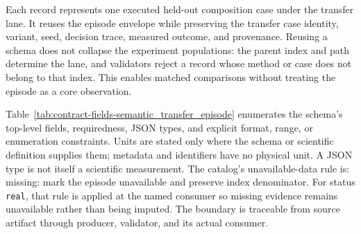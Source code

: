 Each record represents one executed held-out composition case under the transfer lane. It reuses the episode envelope while preserving the transfer case identity, variant, seed, decision trace, measured outcome, and provenance. Reusing a schema does not collapse the experiment populations: the parent index and path determine the lane, and validators reject a record whose method or case does not belong to that index. This enables matched comparisons without treating the episode as a core observation.

Table~\ref{tab:contract-fields-semantic_transfer_episode} enumerates the schema's top-level fields, requiredness, JSON types, and explicit format, range, or enumeration constraints. Units are stated only where the schema or scientific definition supplies them; metadata and identifiers have no physical unit. A JSON type is not itself a scientific measurement. The catalog's unavailable-data rule is: missing: mark the episode unavailable and preserve index denominator. For status \texttt{real}, that rule is applied at the named consumer so missing evidence remains unavailable rather than being imputed. The boundary is traceable from source artifact through producer, validator, and its actual consumer.

